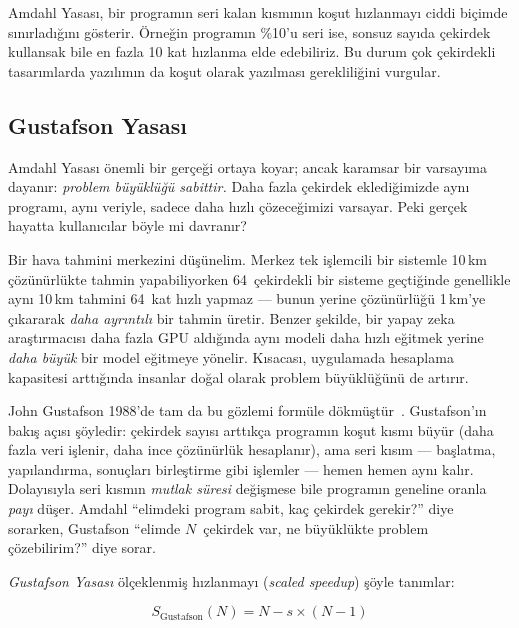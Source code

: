 \begin{bilginot}
Amdahl Yasası, bir programın seri kalan kısmının koşut hızlanmayı ciddi biçimde sınırladığını gösterir. Örneğin programın \%10'u seri ise, sonsuz sayıda çekirdek kullansak bile en fazla 10 kat hızlanma elde edebiliriz. Bu durum çok çekirdekli tasarımlarda yazılımın da koşut olarak yazılması gerekliliğini vurgular.
\end{bilginot}

\subsection{Gustafson Yasası}
\label{subsec:gustafson}

Amdahl Yasası önemli bir gerçeği ortaya koyar; ancak karamsar bir varsayıma dayanır: \emph{problem büyüklüğü sabittir.} Daha fazla çekirdek eklediğimizde aynı programı, aynı veriyle, sadece daha hızlı çözeceğimizi varsayar. Peki gerçek hayatta kullanıcılar böyle mi davranır?

Bir hava tahmini merkezini düşünelim. Merkez tek işlemcili bir sistemle 10\,km çözünürlükte tahmin yapabiliyorken 64~çekirdekli bir sisteme geçtiğinde genellikle aynı 10\,km tahmini 64~kat hızlı yapmaz --- bunun yerine çözünürlüğü 1\,km'ye çıkararak \emph{daha ayrıntılı} bir tahmin üretir. Benzer şekilde, bir yapay zeka araştırmacısı daha fazla GPU aldığında aynı modeli daha hızlı eğitmek yerine \emph{daha büyük} bir model eğitmeye yönelir. Kısacası, uygulamada hesaplama kapasitesi arttığında insanlar doğal olarak problem büyüklüğünü de artırır.

John Gustafson 1988'de tam da bu gözlemi formüle dökmüştür~\cite{gustafson1988}. Gustafson'ın bakış açısı şöyledir: çekirdek sayısı arttıkça programın koşut kısmı büyür (daha fazla veri işlenir, daha ince çözünürlük hesaplanır), ama seri kısım --- başlatma, yapılandırma, sonuçları birleştirme gibi işlemler --- hemen hemen aynı kalır. Dolayısıyla seri kısmın \emph{mutlak süresi} değişmese bile programın geneline oranla \emph{payı} düşer. Amdahl ``elimdeki program sabit, kaç çekirdek gerekir?'' diye sorarken, Gustafson ``elimde $N$~çekirdek var, ne büyüklükte problem çözebilirim?'' diye sorar.

\emph{Gustafson Yasası} ölçeklenmiş hızlanmayı (\emph{scaled speedup}) şöyle tanımlar:

\begin{equation}
S_{\text{Gustafson}}(N) = N - s \times (N - 1)
\label{eq:gustafson}
\end{equation}

